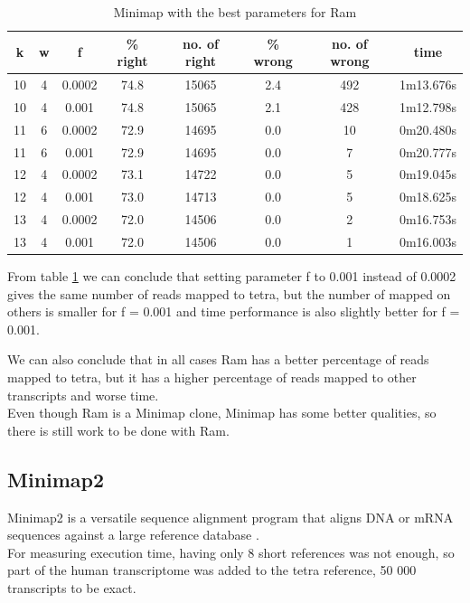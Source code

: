 \documentclass[times, utf8, zavrsni, numeric]{fer}
\begin{document}
\begin{table}[H]
    \caption{Minimap with the best parameters for Ram}
    \centering
    \label{MinimapBestForRam}
    {\begin{tabular}{cccccccc}
    \hline
    \textbf{k} & \textbf{w} & \textbf{f} & \textbf{\% right} & \textbf{no. of right} & \textbf{\% wrong} & \textbf{no. of wrong} & \textbf{time}  \\ \hline
    10 & 4 & 0.0002 & 74.8 & 15065 & 2.4 & 492 & 1m13.676s\\ \hline
    10 & 4 & 0.001 & 74.8 & 15065 & 2.1 & 428 & 1m12.798s\\ \hline
    11 & 6 & 0.0002 & 72.9 & 14695 & 0.0 & 10 & 0m20.480s \\ \hline
    11 & 6 & 0.001 & 72.9 & 14695 & 0.0 & 7 & 0m20.777s \\ \hline
    12 & 4 & 0.0002 & 73.1 & 14722 & 0.0 & 5 & 0m19.045s \\ \hline
    12 & 4 & 0.001 & 73.0 & 14713 & 0.0 & 5 & 0m18.625s \\ \hline
    13 & 4 & 0.0002 & 72.0 & 14506 & 0.0 & 2 & 0m16.753s \\ \hline
    13 & 4 & 0.001 & 72.0 & 14506 & 0.0 & 1 & 0m16.003s \\ \hline
    \end{tabular}}
\end{table}

From table \ref{MinimapBestForRam} we can conclude that setting parameter f to 0.001 instead
of 0.0002 gives the same number of reads mapped to tetra, but the number of mapped on others is 
smaller for f = 0.001 and time performance is also slightly better for f = 0.001. 

We can also conclude that in all cases Ram has a better percentage of reads mapped to tetra, 
but it has a higher percentage of reads mapped to other transcripts and worse time. \\
Even though Ram is a Minimap clone, Minimap has some better qualities, so there is still
work to be done with Ram.



\subsection{Minimap2}
Minimap2 is a versatile sequence alignment program that aligns DNA or mRNA sequences against a large reference database \cite{minimap2} \cite{minimap2man}. \\

For measuring execution time, having only 8 short references was not enough, so 
part of the human transcriptome was added to the tetra reference, 50 000 transcripts to be exact. 
\end{document}
